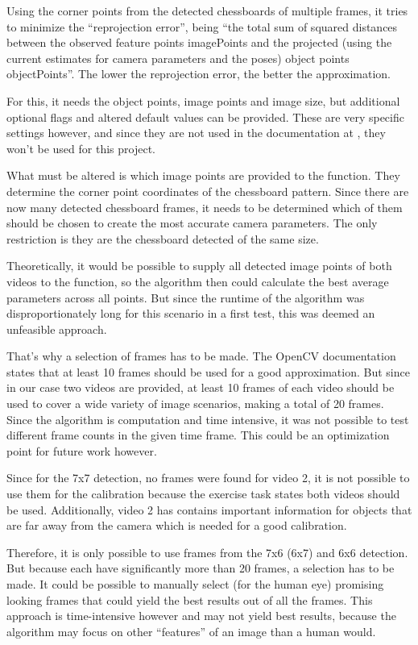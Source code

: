 Using the corner points from the detected chessboards of multiple frames, it tries to minimize the \enquote{reprojection error}, being \enquote{the total sum of squared distances between the observed feature points imagePoints and the projected (using the current estimates for camera parameters and the poses) object points objectPoints}. \cite{cv_calibratecamera} The lower the reprojection error, the better the approximation.

For this, it needs the object points, image points and image size, but additional optional flags and altered default values can be provided. These are very specific settings however, and since they are not used in the documentation at \cite{cv_cctut}, they won't be used for this project.

What must be altered is which image points are provided to the function. They determine the corner point coordinates of the chessboard pattern. Since there are now many detected chessboard frames, it needs to be determined which of them should be chosen to create the most accurate camera parameters. The only restriction is they are the chessboard detected of the same size.

Theoretically, it would be possible to supply all detected image points of both videos to the function, so the algorithm then could calculate the best average parameters across all points. But since the runtime of the algorithm was disproportionately long for this scenario in a first test, this was deemed an unfeasible approach.

That's why a selection of frames has to be made. The OpenCV documentation states that at least 10 frames should be used for a good approximation. \cite{cv_cctut} But since in our case two videos are provided, at least 10 frames of each video should be used to cover a wide variety of image scenarios, making a total of 20 frames. Since the algorithm is computation and time intensive, it was not possible to test different frame counts in the given time frame. This could be an optimization point for future work however.

Since for the 7x7 detection, no frames were found for video 2, it is not possible to use them for the calibration because the exercise task states both videos should be used. Additionally, video 2 has contains important information for objects that are far away from the camera which is needed for a good calibration.

Therefore, it is only possible to use frames from the 7x6 (6x7) and 6x6 detection. But because each have significantly more than 20 frames, a selection has to be made. It could be possible to manually select (for the human eye) promising looking frames that could yield the best results out of all the frames. This approach is time-intensive however and may not yield best results, because the algorithm may focus on other \enquote{features} of an image than a human would.

